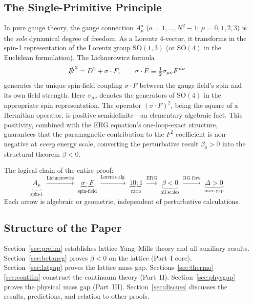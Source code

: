 \documentclass[12pt,a4paper]{article}
\theoremstyle{plain}
\theoremstyle{definition}
\theoremstyle{remark}
\begin{document}
\subsection{The Single-Primitive Principle}\label{sec:primitive}

In pure gauge theory, the gauge connection $A_\mu^a$ ($a=1,\ldots,N^2-1$; $\mu=0,1,2,3$) is the \emph{sole} dynamical degree of freedom. As a Lorentz 4-vector, it transforms in the spin-1 representation of the Lorentz group $\mathrm{SO}(1,3)$ (or $\mathrm{SO}(4)$ in the Euclidean formulation). The Lichnerowicz formula
\begin{equation}\label{eq:Lich}
\slashed{D}^{\,2} = D^2 + \sigma\cdot F, \qquad \sigma\cdot F \equiv \tfrac{1}{2}\sigma_{\mu\nu}F^{\mu\nu}
\end{equation}
generates the unique spin-field coupling $\sigma\cdot F$ between the gauge field's spin and its own field strength. Here $\sigma_{\mu\nu}$ denotes the generators of $\mathrm{SO}(4)$ in the appropriate spin representation. The operator $(\sigma\cdot F)^2$, being the square of a Hermitian operator, is positive semidefinite---an elementary algebraic fact. This positivity, combined with the ERG equation's one-loop-exact structure, guarantees that the paramagnetic contribution to the $F^2$ coefficient is non-negative at \emph{every} energy scale, converting the perturbative result $\beta_0>0$ into the structural theorem $\beta<0$.

The logical chain of the entire proof:
\begin{equation}\label{eq:chain}
\underbrace{A_\mu}_{\text{spin-1}} \;\xrightarrow{\text{Lichnerowicz}}\;
\underbrace{\sigma\cdot F}_{\text{spin-field}} \;\xrightarrow{\text{Lorentz alg.}}\;
\underbrace{10{:}1}_{\text{ratio}} \;\xrightarrow{\text{ERG}}\;
\underbrace{\beta<0}_{\text{all scales}} \;\xrightarrow{\text{RG flow}}\;
\underbrace{\Delta>0}_{\text{mass gap}}
\end{equation}
Each arrow is algebraic or geometric, independent of perturbative calculations.

\subsection{Structure of the Paper}\label{sec:structure}

Section~\ref{sec:prelim} establishes lattice Yang--Mills theory and all auxiliary results. Section~\ref{sec:betaneg} proves $\beta<0$ on the lattice (Part~I core). Section~\ref{sec:latgap} proves the lattice mass gap. Sections~\ref{sec:thermo}--\ref{sec:contlim} construct the continuum theory (Part~II). Section~\ref{sec:physgap} proves the physical mass gap (Part~III). Section~\ref{sec:discuss} discusses the results, predictions, and relation to other proofs.
\end{document}
